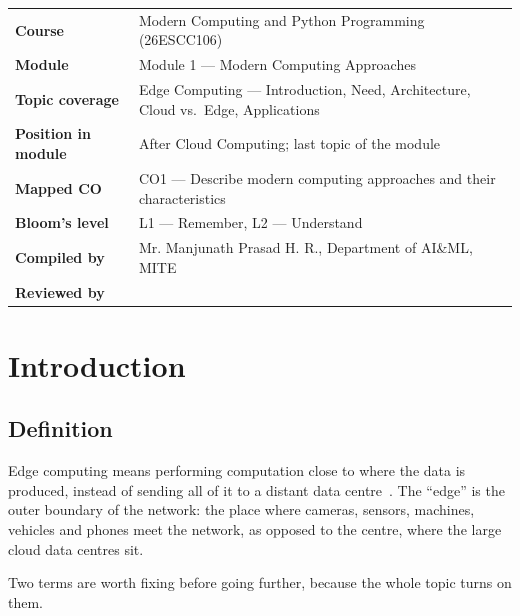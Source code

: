 \documentclass[../main.tex]{subfiles}
\begin{document}

\begin{tabularx}{\textwidth}{@{}>{\bfseries}p{3.4cm}L@{}}
\toprule
Course            & Modern Computing and Python Programming (26ESCC106) \\
Module            & Module 1 --- Modern Computing Approaches \\
Topic coverage    & Edge Computing --- Introduction, Need, Architecture, Cloud vs.\ Edge, Applications \\
Position in module& After Cloud Computing; last topic of the module \\
Mapped CO         & CO1 --- Describe modern computing approaches and their characteristics \\
Bloom's level     & L1 --- Remember, L2 --- Understand \\
Compiled by       & Mr. Manjunath Prasad H. R., Department of AI\&ML, MITE \\
Reviewed by       & \\
\bottomrule
\end{tabularx}

\section{Introduction}

\subsection{Definition}

Edge computing means performing computation close to where the data is
produced, instead of sending all of it to a distant data
centre~. The ``edge'' is the outer boundary of the
network: the place where cameras, sensors, machines, vehicles and phones meet
the network, as opposed to the centre, where the large cloud data centres
sit.

Two terms are worth fixing before going further, because the whole topic
turns on them.
\end{document}
